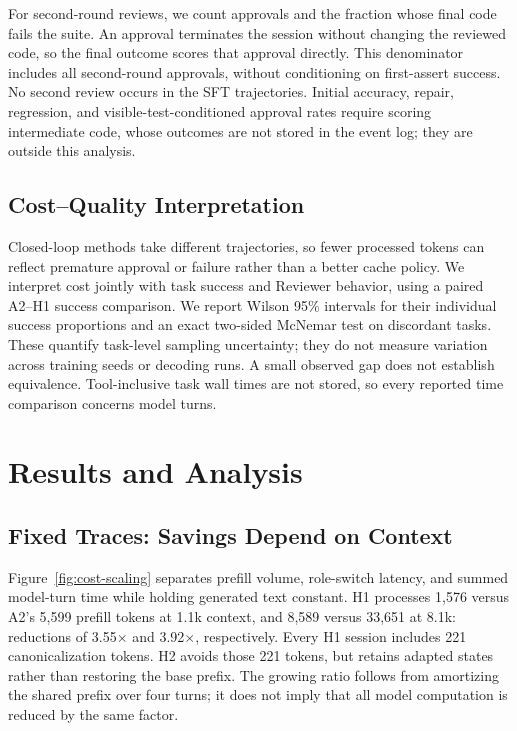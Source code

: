 \documentclass[10pt,twocolumn,letterpaper]{article}
\begin{document}
For second-round reviews, we count approvals and the fraction whose final
code fails the suite. An approval terminates the session without changing
the reviewed code, so the final outcome scores that approval directly.
This denominator includes all second-round approvals, without conditioning
on first-assert success. No second review occurs in the SFT trajectories.
Initial accuracy, repair, regression, and visible-test-conditioned approval
rates require scoring intermediate code, whose outcomes are not stored in
the event log; they are outside this analysis.

\subsection{Cost--Quality Interpretation}
Closed-loop methods take different trajectories, so fewer processed tokens
can reflect premature approval or failure rather than a better cache policy.
We interpret cost jointly with task success and Reviewer behavior, using a
paired A2--H1 success comparison. We report Wilson 95\% intervals for their
individual success proportions and an exact two-sided McNemar test on
discordant tasks. These quantify task-level sampling uncertainty; they do
not measure variation across training seeds or decoding runs. A small observed
gap does not establish equivalence. Tool-inclusive task wall times are not
stored, so every reported time comparison concerns model turns.

\section{Results and Analysis}
\label{sec:results}

\subsection{Fixed Traces: Savings Depend on Context}
Figure~\ref{fig:cost-scaling} separates prefill volume, role-switch latency,
and summed model-turn time while holding generated text constant. H1 processes
1,576 versus A2's 5,599 prefill tokens at 1.1k context, and 8,589 versus
33,651 at 8.1k: reductions of 3.55$\times$ and 3.92$\times$, respectively.
Every H1 session includes 221 canonicalization tokens. H2 avoids those
221 tokens, but retains adapted states rather than restoring the base prefix.
The growing ratio follows from amortizing the shared prefix over four turns;
it does not imply that all model computation is reduced by the same factor.
\end{document}
